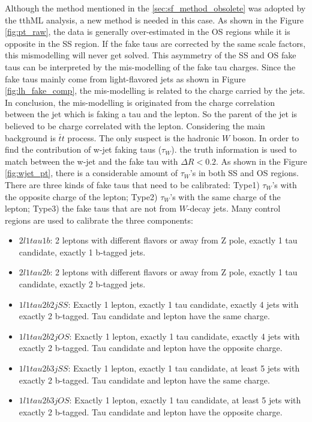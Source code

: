 Although the method mentioned in the \ref{sec:sf_method_obsolete} was adopted by the tthML analysis, a new method is needed in this case. As shown in the Figure \ref{fig:pt_raw}, the data is generally over-estimated in the OS regions while it is opposite in the SS region. If the fake taus are corrected by the same scale factors, this mismodelling will never get solved. This asymmetry of the SS and OS fake taus can be interpreted by the mis-modelling of the fake tau charges. Since the fake taus mainly come from light-flavored jets as shown in Figure \ref{fig:lh_fake_comp}, the mis-modelling is related to the charge carried by the jets. In conclusion, the mis-modelling is originated from the charge correlation between the jet which is faking a tau and the lepton. So the parent of the jet is believed to be charge correlated with the lepton. Considering the main background is $\bar{t}t$ process. The only suspect is the hadronic $W$ boson. In order to find the contribution of w-jet faking taus ($\tau_{W}$).  the truth information is used to match between the w-jet and the fake tau with $\Delta R < 0.2$. As shown in the Figure \ref{fig:wjet_pt}, there is a considerable amount of $\tau_{W}$'s in both SS and OS regions. There are three kinds of fake taus that need to be calibrated: Type1) $\tau_{W}$'s with the opposite charge of the lepton; Type2) $\tau_{W}$'s with the same charge of the lepton; Type3) the fake taus that are not from $W$-decay jets. Many control regions are used to calibrate the three components:

\begin{itemize}
\item{$2l1tau1b$: 2 leptons with different flavors or away from Z pole, exactly 1 tau candidate,  exactly 1 b-tagged jets.}
\item{$2l1tau2b$: 2 leptons with different flavors or away from Z pole, exactly 1 tau candidate,  exactly 2 b-tagged jets.}
\item{$1l1tau2b2j SS$: Exactly 1 lepton, exactly 1 tau candidate, exactly 4 jets with exactly 2 b-tagged. Tau candidate and lepton have the same charge.}
\item{$1l1tau2b2j OS$: Exactly 1 lepton, exactly 1 tau candidate, exactly 4 jets with exactly 2 b-tagged. Tau candidate and lepton have the opposite charge.}
\item{$1l1tau2b3j SS$: Exactly 1 lepton, exactly 1 tau candidate, at least 5 jets with exactly 2 b-tagged. Tau candidate and lepton have the same charge.}
\item{$1l1tau2b3j OS$: Exactly 1 lepton, exactly 1 tau candidate, at least 5 jets with exactly 2 b-tagged. Tau candidate and lepton have the opposite charge.}
\end{itemize}

